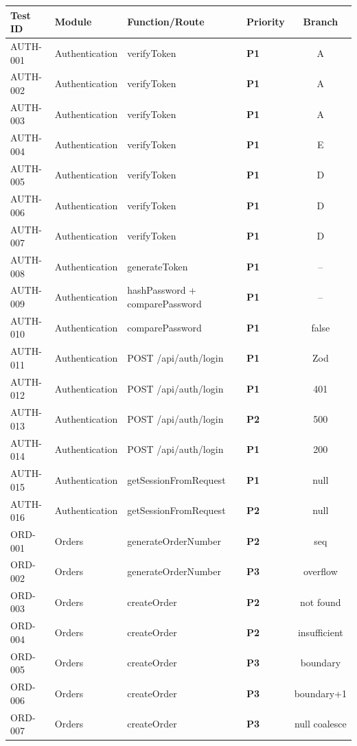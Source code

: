 ﻿\documentclass[12pt,a4paper]{report}
\newcommand{\pone}{\textbf{\color{p1red}P1}}
\newcommand{\ptwo}{\textbf{\color{p2orange}P2}}
\newcommand{\pthree}{\textbf{\color{p3blue}P3}}
\begin{document}
\begin{center}
\begin{longtable}{llllc}
  \toprule
  \textbf{Test ID} & \textbf{Module} & \textbf{Function/Route} & \textbf{Priority} & \textbf{Branch} \\
  \midrule
  \endhead
  AUTH-001 & Authentication & verifyToken & \pone & A \\
  AUTH-002 & Authentication & verifyToken & \pone & A \\
  AUTH-003 & Authentication & verifyToken & \pone & A \\
  AUTH-004 & Authentication & verifyToken & \pone & E \\
  AUTH-005 & Authentication & verifyToken & \pone & D \\
  AUTH-006 & Authentication & verifyToken & \pone & D \\
  AUTH-007 & Authentication & verifyToken & \pone & D \\
  AUTH-008 & Authentication & generateToken & \pone & -- \\
  AUTH-009 & Authentication & hashPassword + comparePassword & \pone & -- \\
  AUTH-010 & Authentication & comparePassword & \pone & false \\
  AUTH-011 & Authentication & POST /api/auth/login & \pone & Zod \\
  AUTH-012 & Authentication & POST /api/auth/login & \pone & 401 \\
  AUTH-013 & Authentication & POST /api/auth/login & \ptwo & 500 \\
  AUTH-014 & Authentication & POST /api/auth/login & \pone & 200 \\
  AUTH-015 & Authentication & getSessionFromRequest & \pone & null \\
  AUTH-016 & Authentication & getSessionFromRequest & \ptwo & null \\
  ORD-001  & Orders & generateOrderNumber & \ptwo & seq \\
  ORD-002  & Orders & generateOrderNumber & \pthree & overflow \\
  ORD-003  & Orders & createOrder & \ptwo & not found \\
  ORD-004  & Orders & createOrder & \ptwo & insufficient \\
  ORD-005  & Orders & createOrder & \pthree & boundary \\
  ORD-006  & Orders & createOrder & \pthree & boundary+1 \\
  ORD-007  & Orders & createOrder & \pthree & null coalesce \\

\end{longtable}
\end{center}
\end{document}
